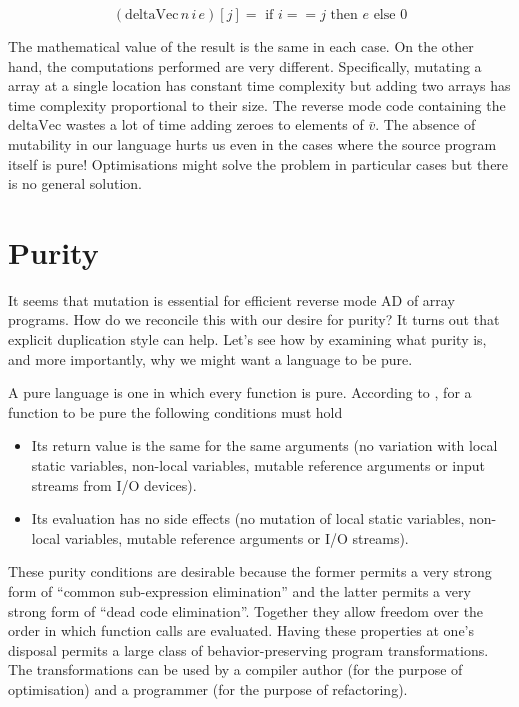 \documentclass[12pt]{article}
\begin{document}
\[
(\textrm{deltaVec} \, n \, i \, e)[j]
= \textrm{ if } i == j \textrm{ then } e  \textrm{ else } 0
\]

The mathematical value of the result is the same in each case.  On the
other hand, the computations performed are very different.
Specifically, mutating a array at a single location has constant time
complexity but adding two arrays has time complexity proportional to
their size.  The reverse mode code containing the $\textrm{deltaVec}$
wastes a lot of time adding zeroes to elements of $\bar{v}$.  The
absence of mutability in our language hurts us even in the cases where
the source program itself is pure!  Optimisations might solve the
problem in particular cases but there is no general solution.


\section{Purity}

It seems that mutation is essential for efficient reverse mode AD of
array programs.  How do we reconcile this with our desire for purity?
It turns out that explicit duplication style can help.  Let's see how
by examining what purity is, and more importantly, why we might want a
language to be pure.

A pure language is one in which every function is pure.  According to
\cite{purity}, for a function to be pure the following conditions must
hold

\begin{itemize}
  \item
    Its return value is the same for the same arguments (no variation
    with local static variables, non-local variables, mutable
    reference arguments or input streams from I/O devices).

  \item
    Its evaluation has no side effects (no mutation of local
    static variables, non-local variables, mutable reference
    arguments or I/O streams).
\end{itemize}

These purity conditions are desirable because the former permits a
very strong form of ``common sub-expression elimination'' and the latter permits a
very strong form of ``dead code elimination''.  Together
they allow freedom over the order in which function calls are
evaluated.  Having these properties at one's disposal permits a large
class of behavior-preserving program transformations.  The
transformations can be used by a compiler author (for the purpose of
optimisation) and a programmer (for the purpose of refactoring).
\end{document}
